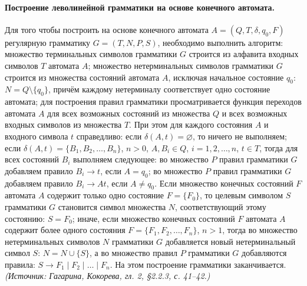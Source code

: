 \documentclass[a4paper,12pt]{article}
\begin{document}
\paragraph{Построение леволинейной грамматики на основе конечного автомата.}
Для того чтобы построить на основе конечного автомата \(A=(Q,T,\delta,q_0,F)\) регулярную грамматику \(G=(T,N,P,S)\), необходимо выполнить алгоритм: множество терминальных символов грамматики \(G\) строится из алфавита входных символов \(T\) автомата \(A\); множество нетерминальных символов грамматики \(G\) строится из множества состояний автомата \(A\), исключая начальное состояние \(q_0\): \(N=Q\setminus\{q_0\}\), причём каждому нетерминалу соответствует одно состояние автомата; для построения правил грамматики просматривается функция переходов автомата \(A\) для всех возможных состояний из множества \(Q\) и всех возможных входных символов из множества \(T\). При этом для каждого состояния \(A\) и входного символа \(t\) справедливо: если \(\delta(A,t)=\varnothing\), то ничего не выполняем; если \(\delta(A,t)=\{B_1,B_2,\ldots,B_n\}\), \(n>0\), \(A,B_i\in Q\), \(i=1,2,\ldots,n\), \(t\in T\), тогда для всех состояний \(B_i\) выполняем следующее: во множество \(P\) правил грамматики \(G\) добавляем правило \(B_i\to t\), если \(A=q_0\); во множество \(P\) правил грамматики \(G\) добавляем правило \(B_i\to At\), если \(A\ne q_0\). Если множество конечных состояний \(F\) автомата \(A\) содержит только одно состояние \(F=\{F_0\}\), то целевым символом \(S\) грамматики \(G\) становится символ множества \(N\), соответствующий этому состоянию: \(S=F_0\); иначе, если множество конечных состояний \(F\) автомата \(A\) содержит более одного состояния \(F=\{F_1,F_2,\ldots,F_n\}\), \(n>1\), тогда во множество нетерминальных символов \(N\) грамматики \(G\) добавляется новый нетерминальный символ \(S\): \(N=N\cup\{S\}\), а во множество правил \(P\) грамматики \(G\) добавляются правила: \(S\to F_1\mid F_2\mid\ldots\mid F_n\). На этом построение грамматики заканчивается.
\textit{(Источник: Гагарина, Кокорева, гл. 2, §2.2.3, с. 41--42.)}
\end{document}
